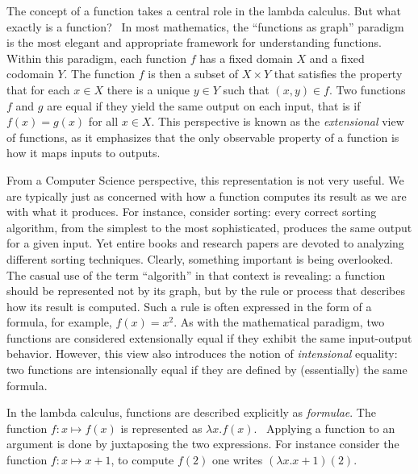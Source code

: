 The concept of a function takes a central role in the lambda calculus. But what exactly is a function?  In most mathematics, the ``functions as graph'' paradigm is the most elegant and appropriate framework for understanding functions. Within this paradigm, each function $f$ has a fixed domain $X$ and a fixed codomain $Y$. The function $f$ is then a subset of $X \times Y$ that satisfies the property that for each $x \in X$ there is a unique $y \in Y$ such that $(x,y) \in f$. Two functions $f$ and $g$ are equal if they yield the same output on each input, that is if $f(x) = g(x)$ for all $x \in X$. This perspective is known as the \emph{extensional} view of functions, as it emphasizes that the only observable property of a function is how it maps inputs to outputs.

From a Computer Science perspective, this representation is not very useful. We are typically just as concerned with how a function computes its result as we are with what it produces. For instance, consider sorting: every correct sorting algorithm, from the simplest to the most sophisticated, produces the same output for a given input. Yet entire books and research papers are devoted to analyzing different sorting techniques. Clearly, something important is being overlooked. The casual use of the term ``algorith'' in that context is revealing: a function should be represented not by its graph, but by the rule or process that describes how its result is computed. Such a rule is often expressed in the form of a formula, for example, \( f(x) = x^2 \). As with the mathematical paradigm, two functions are considered extensionally equal if they exhibit the same input-output behavior. However, this view also introduces the notion of \emph{intensional} equality: two functions are intensionally equal if they are defined by (essentially) the same formula.



In the lambda calculus, functions are described explicitly as \emph{formulae}. The function $f:x \mapsto f(x)$ is represented as $\lambda x.f(x)$.  Applying a function to an argument is done by juxtaposing the two expressions. For instance consider the function $f:x \mapsto x+1$, to compute $f(2)$ one writes $(\lambda x.x+1)(2)$.

